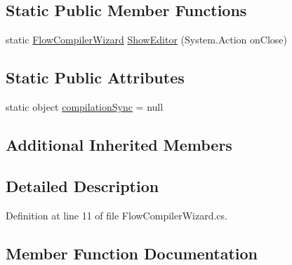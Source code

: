 \subsection*{Static Public Member Functions}
\begin{DoxyCompactItemize}
\item 
static \hyperlink{class_unity_editor_1_1_u_i_1_1_windows_1_1_plugins_1_1_flow_compiler_1_1_flow_compiler_wizard}{Flow\+Compiler\+Wizard} \hyperlink{class_unity_editor_1_1_u_i_1_1_windows_1_1_plugins_1_1_flow_compiler_1_1_flow_compiler_wizard_ae213115c162f70ac82e86e242ea2c6bc}{Show\+Editor} (System.\+Action on\+Close)
\end{DoxyCompactItemize}
\subsection*{Static Public Attributes}
\begin{DoxyCompactItemize}
\item 
static object \hyperlink{class_unity_editor_1_1_u_i_1_1_windows_1_1_plugins_1_1_flow_compiler_1_1_flow_compiler_wizard_a0ad2ea20cd3d641cf5853544c99b9288}{compilation\+Sync} = null
\end{DoxyCompactItemize}
\subsection*{Additional Inherited Members}


\subsection{Detailed Description}


Definition at line 11 of file Flow\+Compiler\+Wizard.\+cs.



\subsection{Member Function Documentation}
\hypertarget{class_unity_editor_1_1_u_i_1_1_windows_1_1_plugins_1_1_flow_compiler_1_1_flow_compiler_wizard_adf0bdc2454848ec79a3489e8ad248251}{}
